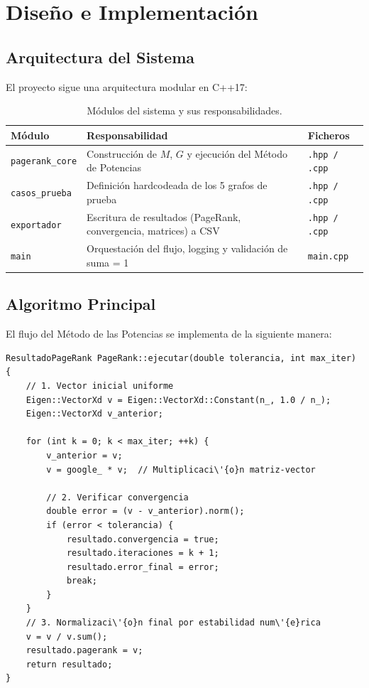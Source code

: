 \documentclass[12pt,a4paper]{article}
\theoremstyle{definition}
\begin{document}
\section{Dise\~{n}o e Implementaci\'{o}n}\label{sec:implementacion}

\subsection{Arquitectura del Sistema}

El proyecto sigue una arquitectura modular en C++17:

\begin{table}[H]
\centering
\caption{M\'{o}dulos del sistema y sus responsabilidades.}
\label{tab:modulos}
\begin{tabular}{@{}lp{7cm}l@{}}
\toprule
\textbf{M\'{o}dulo} & \textbf{Responsabilidad} & \textbf{Ficheros} \\
\midrule
\texttt{pagerank\_core} & Construcci\'{o}n de $M$, $G$ y ejecuci\'{o}n del M\'{e}todo de Potencias & \texttt{.hpp / .cpp} \\
\texttt{casos\_prueba} & Definici\'{o}n hardcodeada de los 5 grafos de prueba & \texttt{.hpp / .cpp} \\
\texttt{exportador} & Escritura de resultados (PageRank, convergencia, matrices) a CSV & \texttt{.hpp / .cpp} \\
\texttt{main} & Orquestaci\'{o}n del flujo, logging y validaci\'{o}n de suma = 1 & \texttt{main.cpp} \\
\bottomrule
\end{tabular}
\end{table}

\subsection{Algoritmo Principal}

El flujo del M\'{e}todo de las Potencias se implementa de la siguiente manera:

\begin{lstlisting}[caption={Implementaci\'{o}n del M\'{e}todo de las Potencias (C++).}]
ResultadoPageRank PageRank::ejecutar(double tolerancia, int max_iter) {
    // 1. Vector inicial uniforme
    Eigen::VectorXd v = Eigen::VectorXd::Constant(n_, 1.0 / n_);
    Eigen::VectorXd v_anterior;
    
    for (int k = 0; k < max_iter; ++k) {
        v_anterior = v;
        v = google_ * v;  // Multiplicaci\'{o}n matriz-vector
        
        // 2. Verificar convergencia
        double error = (v - v_anterior).norm();
        if (error < tolerancia) {
            resultado.convergencia = true;
            resultado.iteraciones = k + 1;
            resultado.error_final = error;
            break;
        }
    }
    // 3. Normalizaci\'{o}n final por estabilidad num\'{e}rica
    v = v / v.sum();
    resultado.pagerank = v;
    return resultado;
}
\end{lstlisting}
\end{document}
